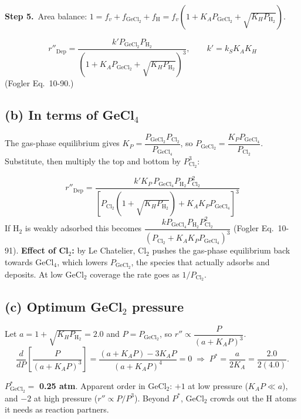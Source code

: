 \documentclass[11pt]{article}
\newcommand{\step}[1]{\par\smallskip\textbf{Step #1.}\ }
\begin{document}
\step{5}Area balance: $1=f_v+f_{\mathrm{GeCl_2}}+f_{\mathrm{H}}=f_v\left(1+K_AP_{\mathrm{GeCl_2}}+\sqrt{K_HP_{\mathrm{H_2}}}\right)$.
\begin{answer}
\[
r''_{\text{Dep}}=\frac{k'P_{\mathrm{GeCl_2}}P_{\mathrm{H_2}}}{\left(1+K_AP_{\mathrm{GeCl_2}}+\sqrt{K_HP_{\mathrm{H_2}}}\right)^3},\qquad k'=k_SK_AK_H
\]
(Fogler Eq.~10-90.)
\end{answer}

\subsection*{(b) In terms of GeCl$_4$}
The gas-phase equilibrium gives $K_P=\dfrac{P_{\mathrm{GeCl_2}}P_{\mathrm{Cl_2}}}{P_{\mathrm{GeCl_4}}}$, so
$P_{\mathrm{GeCl_2}}=\dfrac{K_PP_{\mathrm{GeCl_4}}}{P_{\mathrm{Cl_2}}}$. Substitute, then multiply the top and bottom by $P_{\mathrm{Cl_2}}^3$:
\begin{answer}
\[
r''_{\text{Dep}}=\frac{k'K_P\,P_{\mathrm{GeCl_4}}P_{\mathrm{H_2}}P_{\mathrm{Cl_2}}^2}{\left[P_{\mathrm{Cl_2}}\left(1+\sqrt{K_HP_{\mathrm{H_2}}}\right)+K_AK_PP_{\mathrm{GeCl_4}}\right]^3}
\]
If H$_2$ is weakly adsorbed this becomes $\dfrac{kP_{\mathrm{GeCl_4}}P_{\mathrm{H_2}}P_{\mathrm{Cl_2}}^2}{(P_{\mathrm{Cl_2}}+K_AK_PP_{\mathrm{GeCl_4}})^3}$
(Fogler Eq.~10-91).
\textbf{Effect of Cl$_2$:} by Le Chatelier, Cl$_2$ pushes the gas-phase equilibrium back towards GeCl$_4$, which lowers
$P_{\mathrm{GeCl_2}}$, the species that actually adsorbs and deposits. At low GeCl$_2$ coverage the rate goes as $1/P_{\mathrm{Cl_2}}$.
\end{answer}

\subsection*{(c) Optimum GeCl$_2$ pressure}
Let $a=1+\sqrt{K_HP_{\mathrm{H_2}}}=2.0$ and $P=P_{\mathrm{GeCl_2}}$, so $r''\propto\dfrac{P}{(a+K_AP)^3}$.
\[
\frac{d}{dP}\left[\frac{P}{(a+K_AP)^3}\right]=\frac{(a+K_AP)-3K_AP}{(a+K_AP)^4}=0
\;\Rightarrow\;
P^*=\frac{a}{2K_A}=\frac{2.0}{2(4.0)}.
\]
\begin{answer}
$P^*_{\mathrm{GeCl_2}}=$ \textbf{0.25 atm}. Apparent order in GeCl$_2$: \textbf{$+1$} at low pressure ($K_AP\ll a$), and
\textbf{$-2$} at high pressure ($r''\propto P/P^3$). Beyond $P^*$, GeCl$_2$ crowds out the H atoms it needs as reaction partners.
\end{answer}
\begin{center}
\end{center}
\end{document}
